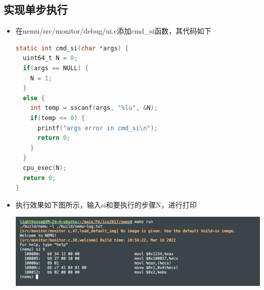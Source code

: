 \documentclass[UTF8,a4paper,10pt]{ctexart}
\begin{document}
\subsection{实现单步执行}
\begin{itemize}
  \item  在nemu/src/monitor/debug/ui.c添加cmd\_si函数，其代码如下
  \begin{lstlisting}[language = C]
static int cmd_si(char *args) {
  uint64_t N = 0;
  if(args == NULL) {
    N = 1;
  }
  else {
    int temp = sscanf(args, "%lu", &N);
    if(temp <= 0) {
      printf("args error in cmd_si\n");
      return 0;
    }
  }
  cpu_exec(N);
  return 0;
}
  \end{lstlisting}
  \item 执行效果如下图所示，输入si和要执行的步骤N，进行打印
  \begin{center}
    \includegraphics[scale = 0.43]{5}
  \end{center}
\end{itemize}
\end{document}

